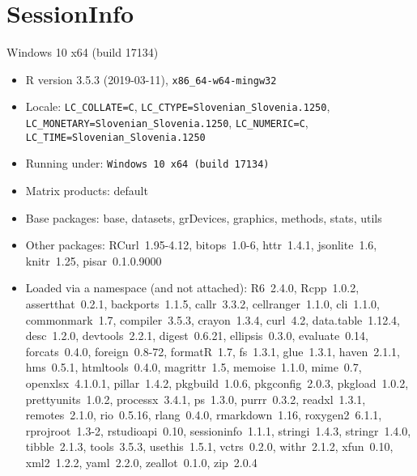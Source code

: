 \documentclass[a4paper,12pt]{article}\usepackage[]{graphicx}\usepackage[]{color}
\begin{document}
\clearpage
\section*{SessionInfo}
Windows 10 x64 (build 17134) 
\begin{itemize}\raggedright
  \item R version 3.5.3 (2019-03-11), \verb|x86_64-w64-mingw32|
  \item Locale: \verb|LC_COLLATE=C|, \verb|LC_CTYPE=Slovenian_Slovenia.1250|, \verb|LC_MONETARY=Slovenian_Slovenia.1250|, \verb|LC_NUMERIC=C|, \verb|LC_TIME=Slovenian_Slovenia.1250|
  \item Running under: \verb|Windows 10 x64 (build 17134)|
  \item Matrix products: default
  \item Base packages: base, datasets, grDevices, graphics,
    methods, stats, utils
  \item Other packages: RCurl~1.95-4.12, bitops~1.0-6,
    httr~1.4.1, jsonlite~1.6, knitr~1.25, pisar~0.1.0.9000
  \item Loaded via a namespace (and not attached): R6~2.4.0,
    Rcpp~1.0.2, assertthat~0.2.1, backports~1.1.5,
    callr~3.3.2, cellranger~1.1.0, cli~1.1.0, commonmark~1.7,
    compiler~3.5.3, crayon~1.3.4, curl~4.2, data.table~1.12.4,
    desc~1.2.0, devtools~2.2.1, digest~0.6.21, ellipsis~0.3.0,
    evaluate~0.14, forcats~0.4.0, foreign~0.8-72, formatR~1.7,
    fs~1.3.1, glue~1.3.1, haven~2.1.1, hms~0.5.1,
    htmltools~0.4.0, magrittr~1.5, memoise~1.1.0, mime~0.7,
    openxlsx~4.1.0.1, pillar~1.4.2, pkgbuild~1.0.6,
    pkgconfig~2.0.3, pkgload~1.0.2, prettyunits~1.0.2,
    processx~3.4.1, ps~1.3.0, purrr~0.3.2, readxl~1.3.1,
    remotes~2.1.0, rio~0.5.16, rlang~0.4.0, rmarkdown~1.16,
    roxygen2~6.1.1, rprojroot~1.3-2, rstudioapi~0.10,
    sessioninfo~1.1.1, stringi~1.4.3, stringr~1.4.0,
    tibble~2.1.3, tools~3.5.3, usethis~1.5.1, vctrs~0.2.0,
    withr~2.1.2, xfun~0.10, xml2~1.2.2, yaml~2.2.0,
    zeallot~0.1.0, zip~2.0.4
\end{itemize}
\end{document}
